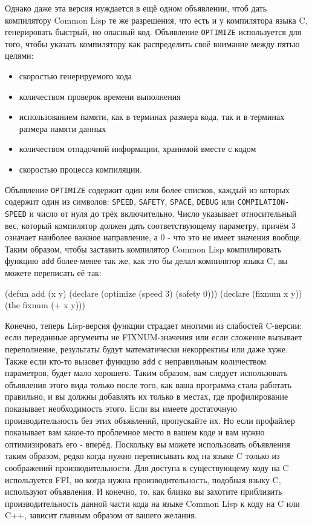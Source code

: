 Однако даже эта версия нуждается в ещё одном объявлении, чтоб дать компилятору Common Lisp
те же разрешения, что есть и у компилятора языка C, генерировать быстрый, но опасный
код. Объявление \lstinline{OPTIMIZE} используется для того, чтобы указать компилятору как
распределить своё внимание между пятью целями:

\begin{itemize}
\item скоростью генерируемого кода
\item количеством проверок времени выполнения
\item использованием памяти, как в терминах размера кода, так и в терминах размера памяти
  данных
\item количеством отладочной информации, хранимой вместе с кодом
\item скоростью процесса компиляции.
\end{itemize}

Объявление \lstinline{OPTIMIZE} содержит один или более списков, каждый из которых содержит
один из символов: \lstinline{SPEED}, \lstinline{SAFETY}, \lstinline{SPACE}, \lstinline{DEBUG} или
\lstinline{COMPILATION-SPEED} и число от нуля до трёх включительно. Число указывает
относительный вес, который компилятор должен дать соответствующему параметру, причём 3
означает наиболее важное направление, а 0 - что это не имеет значения вообще. Таким
образом, чтобы заставить компилятор Common Lisp компилировать функцию \lstinline{add}
более-менее так же, как это бы делал компилятор языка C, вы можете переписать её так:

\begin{myverb}
(defun add (x y)
  (declare (optimize (speed 3) (safety 0)))
  (declare (fixnum x y))
  (the fixnum (+ x y)))
\end{myverb}

Конечно, теперь Lisp-версия функции страдает многими из слабостей C-версии: если
переданные аргументы не FIXNUM-значения или если сложение вызывает переполнение,
результаты будут математически некорректны или даже хуже. Также если кто-то вызовет
функцию \lstinline{add} с неправильным количеством параметров, будет мало хорошего. Таким
образом, вам следует использовать объявления этого вида только после того, как ваша
программа стала работать правильно, и вы должны добавлять их только в местах, где
профилирование показывает необходимость этого. Если вы имеете достаточную
производительность без этих объявлений, пропускайте их. Но если профайлер показывает вам
какое-то проблемное место в вашем коде и вам нужно оптимизировать его - вперёд. Поскольку
вы можете использовать объявления таким образом, редко когда нужно переписывать код на
языке C только из соображений производительности. Для доступа к существующему коду на C
используется FFI, но когда нужна производительность, подобная языку C, используют
объявления. И конечно, то, как близко вы захотите приблизить производительность данной
части кода на языке Common Lisp к коду на C или C++, зависит главным образом от вашего
желания.

